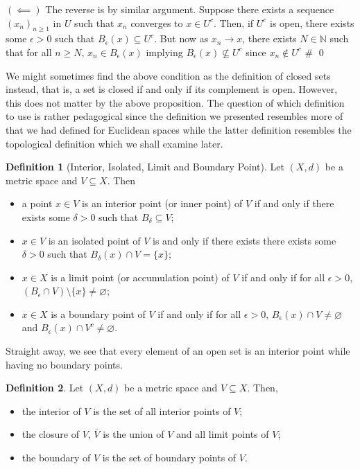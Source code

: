 \documentclass[
]{article}
\theoremstyle{definition}
\newtheorem{definition}{Definition}[section]
\begin{document}
\((\impliedby)\) The reverse is by similar argument. Suppose there
exists a sequence \((x_n)_{n \ge 1}\) in \(U\) such that \(x_n\)
converges to \(x \in U^c\). Then, if \(U^c\) is open, there exists some
\(\epsilon > 0\) such that \(B_\epsilon (x) \subseteq U^c\). But now as
\(x_n \to x\), there exists \(N \in \mathbb{N}\) such that for all
\(n \ge N\), \(x_n \in B_\epsilon(x)\) implying
\(B_\epsilon(x) \not\subseteq U^c\) since \(x_n \not\in U^c\) \# \qed

We might sometimes find the above condition as the definition of closed
sets instead, that is, a set is closed if and only if its complement is
open. However, this does not matter by the above proposition. The
question of which definition to use is rather pedagogical since the
definition we presented resembles more of that we had defined for
Euclidean spaces while the latter definition resembles the topological
definition which we shall examine later.

\begin{definition}[Interior, Isolated, Limit and Boundary Point]
  Let \((X, d)\) be a metric space and \(V \subseteq X\). Then
  \begin{itemize}
    \item a point \(x \in V\) is an interior point (or inner point) of \(V\) if 
      and only if there exists some \(\delta > 0\) such that \(B_\delta \subseteq V\);
    \item \(x \in V\) is an isolated point of \(V\) is and only if there exists 
      there exists some \(\delta > 0\) such that \(B_\delta(x) \cap V = \{x\}\);
    \item \(x \in X\) is a limit point (or accumulation point) of \(V\) if and 
      only if for all \(\epsilon > 0\), 
      \((B_\epsilon \cap V) \setminus \{x\} \neq \varnothing\);
    \item \(x \in X\) is a boundary point of \(V\) if and only if for all 
      \(\epsilon > 0\), \(B_\epsilon(x) \cap V \neq \varnothing\) and 
      \(B_\epsilon(x) \cap V^c \neq \varnothing\).
  \end{itemize}
\end{definition}

Straight away, we see that every element of an open set is an interior
point while having no boundary points.

\begin{definition}
  Let \((X, d)\) be a metric space and \(V \subseteq X\). Then, 
  \begin{itemize}
    \item the interior of \(V\) is the set of all interior points of \(V\);
    \item the closure of \(V\), \(\bar{V}\) is the union of \(V\) and all limit points of \(V\);
    \item the boundary of \(V\) is the set of boundary points of \(V\).
  \end{itemize}
\end{definition}
\end{document}
